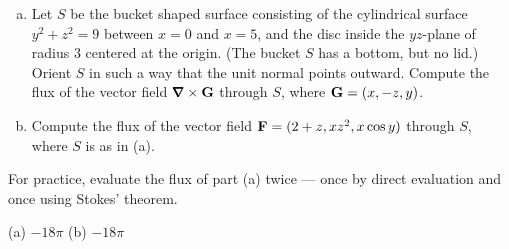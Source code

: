 \begin{question}[M317 2012D] %
\begin{enumerate}[(a)]
\item
Let $S$ be the bucket shaped surface consisting of the cylindrical surface 
$y^2 + z^2 = 9$ between $x = 0$ and $x = 5$, and the disc inside the 
$yz$-plane of radius $3$ centered at the origin. (The bucket $S$ 
has a bottom, but no lid.) Orient $S$ in such a way that the unit normal 
points outward. Compute the flux of the vector field $\vnabla\times\vG$
through $S$, where $\mathbf{G} = (x, -z, y)$.
\item
Compute the flux of the vector field $\mathbf{F} = (2 + z, xz^2 , x \cos y)$ 
through $S$, where $S$ is as in (a).
\end{enumerate}
\end{question}

\begin{hint} 
For practice, evaluate the flux of part (a) twice --- once by direct
evaluation and once using Stokes' theorem.
\end{hint}

\begin{answer} 
(a) $-18\pi$ \qquad
(b) $-18\pi$
\end{answer}


